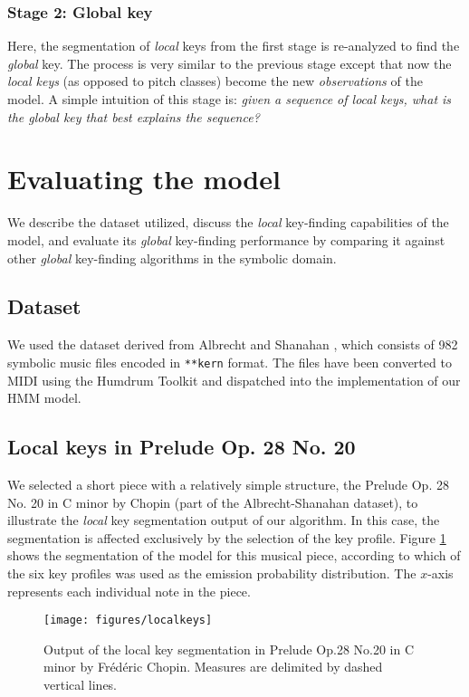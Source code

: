 \documentclass[sigconf]{acmart}
\begin{document}
\subsubsection{Stage 2: Global key}
Here, the segmentation of \emph{local} keys from the first stage is re-analyzed to find the \emph{global} key. The process is very similar to the previous stage except that now the \emph{local keys} (as opposed to pitch classes) become the new \emph{observations} of the model. A simple intuition of this stage is: \emph{given a sequence of local keys, what is the global key that best explains the sequence?}

\section{Evaluating the model}
We describe the dataset utilized, discuss the \emph{local} key-finding capabilities of the model, and evaluate its \emph{global} key-finding performance by comparing it against other \emph{global} key-finding algorithms in the symbolic domain.

\subsection{Dataset}
We used the dataset derived from Albrecht and Shanahan \cite{albrecht2013use}, which consists of 982 symbolic music files encoded in \texttt{**kern} format. The files have been converted to MIDI using the Humdrum Toolkit \cite{huron2002music} and dispatched into the implementation of our HMM model.

\subsection{Local keys in Prelude Op. 28 No. 20}
We selected a short piece with a relatively simple structure, the Prelude Op. 28 No. 20 in C minor by Chopin (part of the Albrecht-Shanahan dataset), to illustrate the \emph{local} key segmentation output of our algorithm.
In this case, the segmentation is affected exclusively by the selection of the key profile. Figure \ref{fig:localkeys} shows the segmentation of the model for this musical piece, according to which of the six key profiles was used as the emission probability distribution. The $x$-axis represents each individual note in the piece.

\begin{figure}[ht]
  \centering
  \texttt{[image: figures/localkeys]}
  \caption{Output of the local key segmentation in Prelude Op.28 No.20 in C minor by Fr\'ed\'eric Chopin. Measures are delimited by dashed vertical lines.}
  \label{fig:localkeys}
\end{figure}
\end{document}
